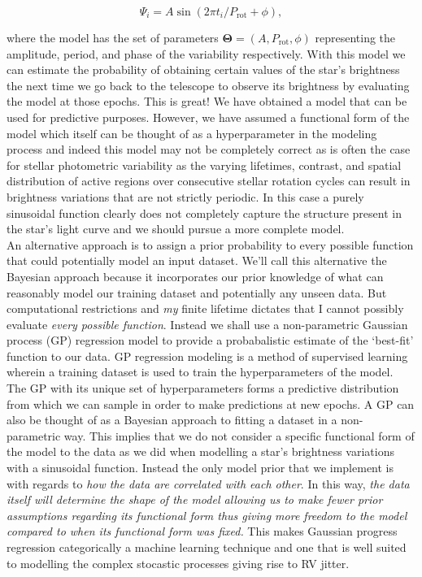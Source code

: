 \begin{equation}
\Psi_i = A\sin{(2\pi t_i/P_{\mathrm{rot}}+\phi)},
\end{equation}

\noindent where the model 
has the set of parameters $\mathbf{\Theta}=(A,P_{\mathrm{rot}},\phi)$ representing the 
amplitude, period, and phase of the variability respectively. 
With this model we can estimate the probability of 
obtaining certain values of the star's brightness the next time we go back to the 
telescope to observe its brightness by evaluating the model at those epochs. 
This is great! We have obtained a model that  
can be used for predictive purposes. However, we have assumed a functional form of the 
model which itself can be thought of as a hyperparameter in the modeling process  
and indeed this model may not be completely correct as is often the case for stellar 
photometric variability as the varying lifetimes, contrast, and spatial distribution of 
active regions over consecutive stellar rotation cycles can result in brightness variations 
that are not strictly periodic. In this case a purely sinusoidal function clearly does not 
completely capture the structure present in the star's light curve and we should pursue 
a more complete model. \\

An alternative approach is to assign a prior probability to every possible function 
that could potentially model an input dataset. We'll call this alternative the Bayesian 
approach because it incorporates our prior knowledge of what can reasonably model our 
training dataset and potentially any unseen data. But computational 
restrictions and \emph{my} finite lifetime dictates that I cannot possibly evaluate 
\emph{every possible function}. Instead we shall use a non-parametric Gaussian 
process (GP) regression model to provide a probabalistic estimate of the `best-fit'
function to our data. GP regression modeling is a method of supervised learning 
wherein a training dataset is used to train the hyperparameters of the model. The 
GP with its unique set of hyperparameters forms a predictive distribution from which we 
can sample in order to make predictions at new epochs. 
A GP can also be thought of as a Bayesian approach to fitting a dataset in a 
non-parametric way. This implies that we do not consider a specific functional 
form of the model to the data as we did when modelling a star's brightness variations 
with a sinusoidal function. Instead the only model prior that we implement is with 
regards to \emph{how the data are correlated with each other}. In this way, 
\emph{the data itself 
will determine the shape of the model allowing us to make fewer prior assumptions 
regarding its functional form  
thus giving more freedom to the model compared to when its functional form was 
fixed.} This makes Gaussian progress regression categorically a machine learning 
technique and one that is well suited to modelling the complex stocastic processes giving
rise to RV jitter. \\

